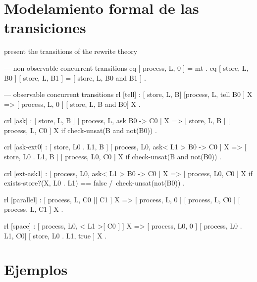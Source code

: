 \section{Modelamiento formal de las transiciones}
\label{rules.rew}

present the transitions of the rewrite theory

\begin{maude}
--- non-observable concurrent transitions
  eq [ process, L, 0 ]
   = mt .
  eq [ store, L, B0 ] [ store, L, B1 ]
   = [ store, L, B0 and B1 ] .

  --- observable concurrent transitions
  rl [tell] :
     { [ store, L, B] [process, L, tell B0 ] X }
  => { [ process, L, 0 ] [ store, L, B and B0] X } .

 crl [ask] :
     { [ store, L, B ] [ process, L, ask B0  -> C0 ] X }
  => { [ store, L, B ] [ process, L, C0 ] X }
  if check-unsat(B and not(B0)) .

 crl [ask-ext0] :
     { [ store, L0 . L1, B ] [ process, L0, ask< L1 > B0  -> C0 ] X }
  => { [ store, L0 . L1, B ] [ process, L0, C0 ] X }
  if check-unsat(B and not(B0)) . 

 crl [ext-ask1] :
     { [ process, L0, ask< L1 > B0  -> C0 ] X }
  => { [ process, L0, C0 ] X }
  if exists-store?(X, L0 . L1) == false
  /\ check-unsat(not(B0)) . 

  rl [parallel] :
     { [ process, L, C0 || C1 ] X }
  => { [ process, L, 0 ] [ process, L, C0 ] [ process, L, C1 ] X } .

  rl [space] :
     { [ process, L0, < L1 >[ C0 ] ] X } 
  => { [ process, L0, 0 ] [ process, L0 . L1, C0] [ store, L0 . L1, true ] X } .
\end{maude}

\section{Ejemplos}
\label{example.rew}


